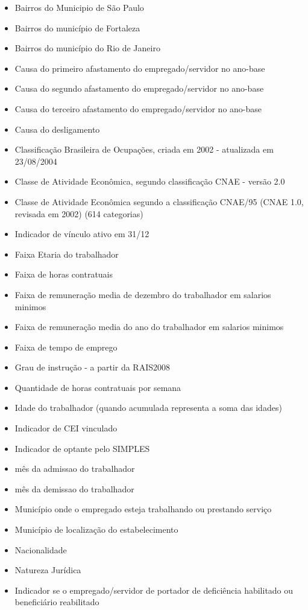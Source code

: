 \documentclass[12pt]{article}
\begin{document}
\begin{itemize}
\item Bairros do Municipio de São Paulo
\item Bairros do município de Fortaleza
\item Bairros do município do Rio de Janeiro
\item Causa do primeiro afastamento do empregado/servidor no ano-base 
\item Causa do segundo afastamento do empregado/servidor no ano-base 
\item Causa do terceiro afastamento do empregado/servidor no ano-base
\item Causa do desligamento 
\item Classificação Brasileira de Ocupações, criada em 2002 - atualizada em 23/08/2004
\item Classe de Atividade Econômica, segundo classificação CNAE - versão 2.0
\item Classe de Atividade Econômica segundo a classificação CNAE/95 (CNAE 1.0, revisada em 2002) (614 categorias)
\item Indicador de vínculo ativo em 31/12
\item Faixa Etaria do trabalhador
\item Faixa de horas contratuais
\item Faixa de remuneração media de dezembro do trabalhador em salarios minimos
\item Faixa de remuneração media do ano do trabalhador em salarios minimos
\item Faixa de tempo de emprego
\item Grau de instrução - a partir da RAIS2008
\item Quantidade de horas contratuais por semana
\item Idade do trabalhador  (quando acumulada representa a soma das idades)
\item Indicador de CEI vinculado
\item Indicador de optante pelo SIMPLES 
\item mês da admissao do trabalhador
\item mês da demissao do trabalhador
\item Município onde o empregado esteja trabalhando ou prestando serviço 
\item Município de localização do estabelecimento
\item Nacionalidade
\item Natureza Jurídica 
\item Indicador se o empregado/servidor de portador de deficiência habilitado ou beneficiário reabilitado

\end{itemize}
\end{document}
